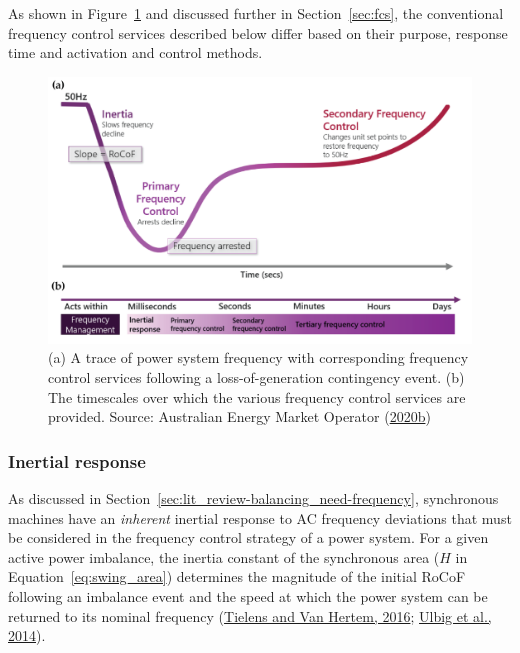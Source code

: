 \documentclass[12pt,a4paper,]{report}
\begin{document}
As shown in Figure~\ref{fig:freq_control} and discussed further in
Section~\ref{sec:fcs}, the conventional frequency control services
described below differ based on their purpose, response time and
activation and control methods.

\begin{figure}
\hypertarget{fig:freq_control}{%
\centering
\includegraphics{source/figures/freq_control_timeframes.png}
\caption[Sequence and timescales of typical frequency control
services]{(a) A trace of power system frequency with corresponding
frequency control services following a loss-of-generation contingency
event. (b) The timescales over which the various frequency control
services are provided. Source: Australian Energy Market Operator
(\protect\hyperlink{ref-australianenergymarketoperatorPowerSystemRequirements2020}{2020b})}\label{fig:freq_control}
}
\end{figure}

\hypertarget{sec:lit_review-balancing_practices-inertial_response}{%
\subsubsection{Inertial
response}\label{sec:lit_review-balancing_practices-inertial_response}}

As discussed in Section~\ref{sec:lit_review-balancing_need-frequency},
synchronous machines have an \emph{inherent} inertial response to AC
frequency deviations that must be considered in the frequency control
strategy of a power system. For a given active power imbalance, the
inertia constant of the synchronous area (\(H\) in
Equation~\ref{eq:swing_area}) determines the magnitude of the initial
RoCoF following an imbalance event and the speed at which the power
system can be returned to its nominal frequency
(\protect\hyperlink{ref-tielensRelevanceInertiaPower2016}{Tielens and
Van Hertem, 2016};
\protect\hyperlink{ref-ulbigImpactLowRotational2014}{Ulbig et al.,
2014}).
\end{document}
